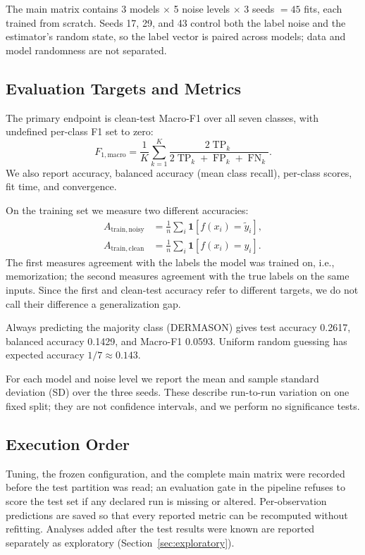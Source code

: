 \documentclass[conference,letterpaper]{IEEEtran}
\begin{document}
The main matrix contains 3 models $\times$ 5 noise levels $\times$ 3 seeds $=45$ fits, each trained from scratch. Seeds 17, 29, and 43 control both the label noise and the estimator's random state, so the label vector is paired across models; data and model randomness are not separated.

\subsection{Evaluation Targets and Metrics}
The primary endpoint is clean-test Macro-F1 over all seven classes, with undefined per-class F1 set to zero:
\begin{equation}
F_{1,\mathrm{macro}}=\frac{1}{K}\sum_{k=1}^{K}
\frac{2\operatorname{TP}_k}{2\operatorname{TP}_k+\operatorname{FP}_k+\operatorname{FN}_k}.
\label{eq:macro}
\end{equation}
We also report accuracy, balanced accuracy (mean class recall), per-class scores, fit time, and convergence.

On the training set we measure two different accuracies:
\begin{align}
A_{\mathrm{train,noisy}}&=\frac{1}{n}\sum_i
\mathbf{1}[f(x_i)=\widetilde y_i],\\
A_{\mathrm{train,clean}}&=\frac{1}{n}\sum_i
\mathbf{1}[f(x_i)=y_i].
\end{align}
The first measures agreement with the labels the model was trained on, i.e., memorization; the second measures agreement with the true labels on the same inputs. Since the first and clean-test accuracy refer to different targets, we do not call their difference a generalization gap.

Always predicting the majority class (DERMASON) gives test accuracy 0.2617, balanced accuracy 0.1429, and Macro-F1 0.0593. Uniform random guessing has expected accuracy $1/7\approx0.143$.

For each model and noise level we report the mean and sample standard deviation (SD) over the three seeds. These describe run-to-run variation on one fixed split; they are not confidence intervals, and we perform no significance tests.

\subsection{Execution Order}
Tuning, the frozen configuration, and the complete main matrix were recorded before the test partition was read; an evaluation gate in the pipeline refuses to score the test set if any declared run is missing or altered. Per-observation predictions are saved so that every reported metric can be recomputed without refitting. Analyses added after the test results were known are reported separately as exploratory (Section~\ref{sec:exploratory}).
\end{document}

